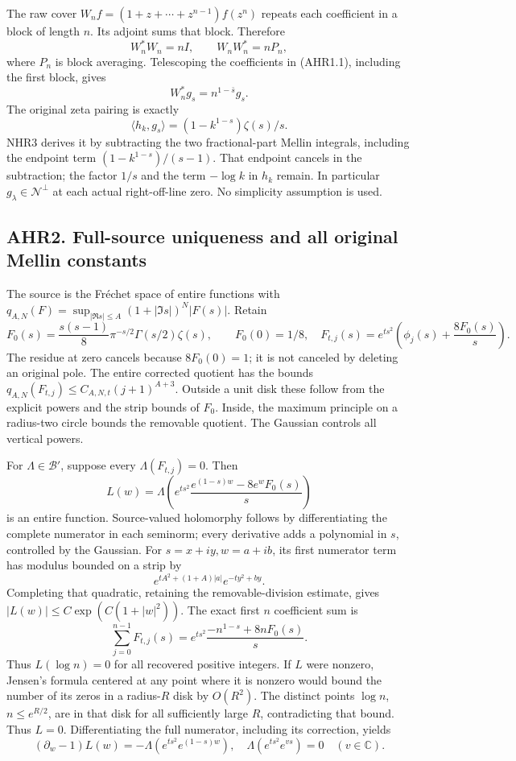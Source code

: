 The raw cover \(W_nf=(1+z+\cdots+z^{n-1})f(z^n)\) repeats each
coefficient in a block of length \(n\). Its adjoint sums that block.
Therefore \[
W_n^*W_n=nI,\qquad W_nW_n^*=nP_n,
\tag{AHR1.3}
\] where \(P_n\) is block averaging. Telescoping the coefficients in
(AHR1.1), including the first block, gives \[
W_n^*g_s=n^{1-\bar s}g_s.
\tag{AHR1.4}
\] The original zeta pairing is exactly \[
\langle h_k,g_s\rangle=(1-k^{1-s})\zeta(s)/s.
\tag{AHR1.5}
\] NHR3 derives it by subtracting the two fractional-part Mellin
integrals, including the endpoint term \((1-k^{1-s})/(s-1)\). That
endpoint cancels in the subtraction; the factor \(1/s\) and the term
\(-\log k\) in \(h_k\) remain. In particular
\(g_\lambda\in\mathcal N^\perp\) at each actual right-off-line zero. No
simplicity assumption is used.

\subsection{AHR2. Full-source uniqueness and all original Mellin
constants}\label{ahr2.-full-source-uniqueness-and-all-original-mellin-constants}

The source is the Fréchet space of entire functions with
\(q_{A,N}(F)=\sup_{|\Re s|\le A}(1+|\Im s|)^N|F(s)|\). Retain \[
F_0(s)=\frac{s(s-1)}8\pi^{-s/2}\Gamma(s/2)\zeta(s),\qquad F_0(0)=1/8,
\quad F_{t,j}(s)=e^{ts^2}\left(\phi_j(s)+\frac{8F_0(s)}s\right).
\tag{AHR2.1}
\] The residue at zero cancels because \(8F_0(0)=1\); it is not canceled
by deleting an original pole. The entire corrected quotient has the
bounds \(q_{A,N}(F_{t,j})\le C_{A,N,t}(j+1)^{A+3}\). Outside a unit disk
these follow from the explicit powers and the strip bounds of \(F_0\).
Inside, the maximum principle on a radius-two circle bounds the
removable quotient. The Gaussian controls all vertical powers.

For \(\Lambda\in\mathcal B'\), suppose every \(\Lambda(F_{t,j})=0\).
Then \[
L(w)=\Lambda\left(e^{ts^2}\frac{e^{(1-s)w}-8e^wF_0(s)}s\right)
\tag{AHR2.2}
\] is an entire function. Source-valued holomorphy follows by
differentiating the complete numerator in each seminorm; every
derivative adds a polynomial in \(s\), controlled by the Gaussian. For
\(s=x+iy,w=a+ib\), its first numerator term has modulus bounded on a
strip by \[
e^{tA^2+(1+A)|a|}e^{-ty^2+by}.
\] Completing that quadratic, retaining the removable-division estimate,
gives \(|L(w)|\le C\exp(C(1+|w|^2))\). The exact first \(n\) coefficient
sum is \[
\sum_{j=0}^{n-1}F_{t,j}(s)
=e^{ts^2}\frac{-n^{1-s}+8nF_0(s)}s.
\] Thus \(L(\log n)=0\) for all recovered positive integers. If \(L\)
were nonzero, Jensen's formula centered at any point where it is nonzero
would bound the number of its zeros in a radius-\(R\) disk by
\(O(R^2)\). The distinct points \(\log n\), \(n\le e^{R/2}\), are in
that disk for all sufficiently large \(R\), contradicting that bound.
Thus \(L=0\). Differentiating the full numerator, including its
correction, yields \[
(\partial_w-1)L(w)=-\Lambda(e^{ts^2}e^{(1-s)w}),
\quad\Lambda(e^{ts^2}e^{vs})=0\quad(v\in\mathbb C).
\tag{AHR2.3}
\]

